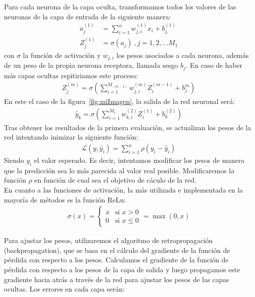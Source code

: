 \documentclass[11pt]{book}
\theoremstyle{plain} %
\theoremstyle{definition} %
\begin{document}
Para cada neurona de la capa oculta, transformamos todos los valores de las neuronas 
de la capa de entrada de la siguiente manera:
\begin{align*}
    a_j^{(1)} &= \sum_{i=1}^n w_{j,i}^{(1)}x_i+b_{j,}^{(1)}\\
    Z_j^{(1)} &= \sigma(a_j)\:, j = 1, 2, \dots M_1
\end{align*}
con $\sigma$ la función de activación y $w_{j,i}$ los pesos asociados a cada neurona, 
además de un peso de la propia neurona receptora, llamada sesgo $b_{j}$. En caso de 
haber más  capas ocultas repitiriamos este proceso:
\begin{align*}
    Z_j^{(m)} = \sigma\left(\sum_{i = 1}^{M_{(m-1)}}w_{j,i}^{(m)}Z_i^{(m-1)}+b_{j}^m\right)
\end{align*}
En este el caso de la figura~\ref{fig:miImagen}, la salida de la red neuronal será:
\begin{align*}
\hat{y}_k = \sigma\left(\sum_{i=1}^{M_1} w_{k,i}^{(2)}Z_i^{(1)}+b_{k}^{(2)}\right)
\end{align*}
Tras obtener los resultados de la primera evaluación, se actualizan los pesos de la 
red intentando inimizar la siguiente función:
\begin{align*}
   \mathcal{L}(y, \hat{y}_i) = \sum_{i=1}^n \rho(y_i - \hat{y}_i)
\end{align*}
Siendo $y_i$ el valor esperado. Es decir, intentamos modificar los pesos de manera que 
la predicción sea lo más parecida al valor real posible. Modificaremos la función $\rho$ 
en función de cual sea el objetivo de cáculo de la red. \\

En cuanto a las funciones de activación, la más utilizada e implementada en la mayoría 
de métodos es la función ReLu:
\begin{align*}
      \sigma(x) = 
      \begin{cases}
         x & \text{si } x > 0 \\
         0 & \text{si } x \leq 0
      \end{cases} = \max(0, x)
\end{align*}


Para ajustar los pesos, utilizaremos el algoritmo de retropropagación (backpropagation), que 
se basa en el cálculo del gradiente de la función de pérdida con respecto a los pesos.
Calculamos el gradiente de la función de pérdida con respecto a los pesos de la 
capa de salida y luego propagamos este gradiente hacia atrás a través de la red para
ajustar los pesos de las capas ocultas. Los errores en cada capa serán:
\end{document}
